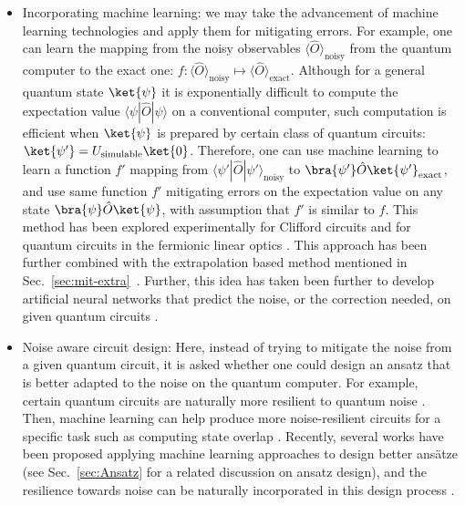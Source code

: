 \begin{itemize}
\item Incorporating machine learning: we may take the advancement of machine learning technologies and apply them for mitigating errors. For example, one can learn the mapping from the noisy observables $\langle \hat{O} \rangle_{\mathrm{noisy}}$ from the quantum computer to the exact one: $f:\langle \hat{O} \rangle _{\mathrm{noisy}} \mapsto \langle \hat{O} \rangle _{\mathrm{exact}}$. Although for a general quantum state $\ket{\psi }$ it is exponentially difficult to compute the expectation value $\langle \psi |\hat{O} |\psi \rangle $ on a conventional computer, such computation is efficient when $\ket{\psi }$ is prepared by certain class of quantum circuits: $\ket{\psi '} =U_{\mathrm{simulable}}\ket{0}$. Therefore, one can use machine learning to learn a function $f'$ mapping from $\langle \psi ' |\hat{O} |\psi'\rangle_{\mathrm{noisy}}$ to $\bra{\psi '}\hat{O}\ket{\psi '}_{\mathrm{exact}}$, and use same function $f'$ mitigating errors on the expectation value on any state $\bra{\psi }\hat{O}\ket{\psi }$, with assumption that $f'$ is similar to $f$. This method has been explored experimentally for Clifford circuits \cite{czarnikErrorMitigationClifford2021} and for quantum circuits in the fermionic linear optics \cite{montanaroErrorMitigationTraining2021}. This approach has been further combined with the extrapolation based method mentioned in Sec.~\ref{sec:mit-extra}~\cite{loweUnifiedApproachDatadriven2020a}. Further, this idea has taken been further to develop artificial neural networks that predict the noise, or the correction needed, on given quantum circuits \cite{kimQuantumErrorMitigation2020, zlokapaDeepLearningModel2020}.

\item Noise aware circuit design: Here, instead of trying to mitigate the noise from a given quantum circuit, it is asked whether one could design an ansatz that is better adapted to the noise on the quantum computer. For example, certain quantum circuits are naturally more resilient to quantum noise \cite{kim2017noiseresilient}. Then, machine learning can help produce more noise-resilient circuits for a specific task such as computing state overlap \cite{cincioMachineLearningNoiseResilient2021}. Recently, several works have been proposed applying machine learning approaches to design better ans\"atze (see Sec.~\ref{sec:Ansatz} for a related discussion on ansatz design), and the resilience towards noise can be naturally incorporated in this design process \cite{Wang2021_QAS,Du2020}.


\end{itemize}
